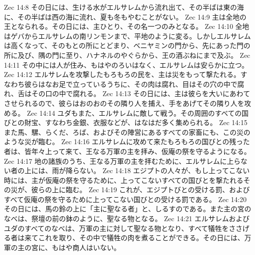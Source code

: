 Zec 14:8  その日には、生ける水がエルサレムから流れ出て、その半ばは東の海に、その半ばは西の海に流れ、夏も冬もやむことがない。
Zec 14:9  主は全地の王となられる。その日には、主ひとり、その名一つのみとなる。
Zec 14:10  全地はゲバからエルサレムの南リンモンまで、平地のように変る。しかしエルサレムは高くなって、そのもとの所にとどまり、ベニヤミンの門から、先にあった門の所に及び、隅の門に至り、ハナネルのやぐらから、王の酒ぶねにまで及ぶ。
Zec 14:11  その中には人が住み、もはやのろいはなく、エルサレムは安らかに立つ。
Zec 14:12  エルサレムを攻撃したもろもろの民を、主は災をもって撃たれる。すなわち彼らはなお足で立っているうちに、その肉は腐れ、目はその穴の中で腐れ、舌はその口の中で腐れる。
Zec 14:13  その日には、主は彼らを大いにあわてさせられるので、彼らはおのおのその隣り人を捕え、手をあげてその隣り人を攻める。
Zec 14:14  ユダもまた、エルサレムに敵して戦う。その周囲のすべての国びとの財宝、すなわち金銀、衣服などが、はなはだ多く集められる。
Zec 14:15  また馬、騾、らくだ、ろば、およびその陣営にあるすべての家畜にも、この災のような災が臨む。
Zec 14:16  エルサレムに攻めて来たもろもろの国びとの残った者は、皆年々上って来て、王なる万軍の主を拝み、仮庵の祭を守るようになる。
Zec 14:17  地の諸族のうち、王なる万軍の主を拝むために、エルサレムに上らない者の上には、雨が降らない。
Zec 14:18  エジプトの人々が、もし上ってこない時には、主が仮庵の祭を守るために、上ってこないすべての国びとを撃たれるその災が、彼らの上に臨む。
Zec 14:19  これが、エジプトびとの受ける罰、およびすべて仮庵の祭を守るために上ってこない国びとの受ける罰である。
Zec 14:20  その日には、馬の鈴の上に「主に聖なる者」と、しるすのである。また主の宮のなべは、祭壇の前の鉢のように、聖なる物となる。
Zec 14:21  エルサレムおよびユダのすべてのなべは、万軍の主に対して聖なる物となり、すべて犠牲をささげる者は来てこれを取り、その中で犠牲の肉を煮ることができる。その日には、万軍の主の宮に、もはや商人はいない。


